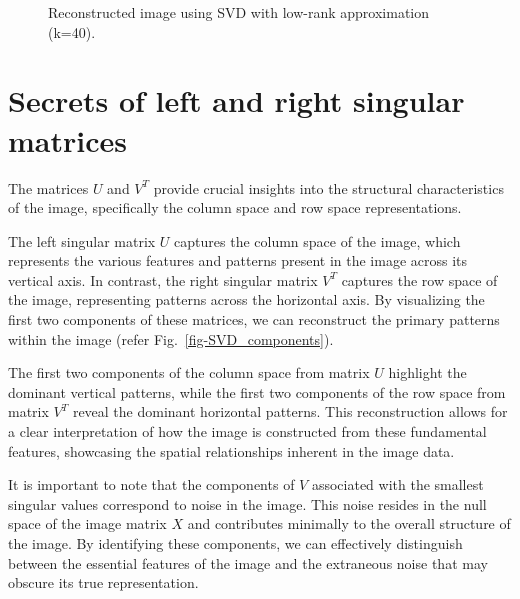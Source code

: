 \documentclass[
  journal,
]{IEEEtran}%
\begin{document}
\begin{figure}


\caption{\label{fig-svdreconstruction}Reconstructed image using SVD with
low-rank approximation (k=40).}

\end{figure}%

\section{Secrets of left and right singular
matrices}\label{secrets-of-left-and-right-singular-matrices}

The matrices \(U\) and \(V^T\) provide crucial insights into the
structural characteristics of the image, specifically the column space
and row space representations.

The left singular matrix \(U\) captures the column space of the image,
which represents the various features and patterns present in the image
across its vertical axis. In contrast, the right singular matrix \(V^T\)
captures the row space of the image, representing patterns across the
horizontal axis. By visualizing the first two components of these
matrices, we can reconstruct the primary patterns within the image
(refer Fig.~\ref{fig-SVD_components}).

The first two components of the column space from matrix \(U\) highlight
the dominant vertical patterns, while the first two components of the
row space from matrix \(V^T\) reveal the dominant horizontal patterns.
This reconstruction allows for a clear interpretation of how the image
is constructed from these fundamental features, showcasing the spatial
relationships inherent in the image data.

It is important to note that the components of \(V\) associated with the
smallest singular values correspond to noise in the image. This noise
resides in the null space of the image matrix \(X\) and contributes
minimally to the overall structure of the image. By identifying these
components, we can effectively distinguish between the essential
features of the image and the extraneous noise that may obscure its true
representation.
\end{document}
